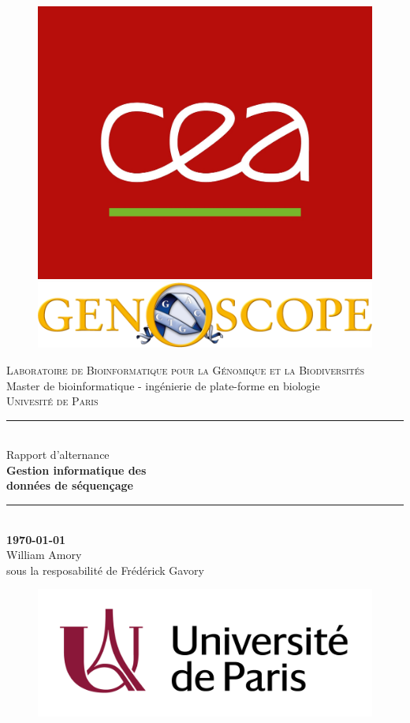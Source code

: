 \begin{titlepage}

    \newcommand{\HRule}{\rule{\linewidth}{0.5mm}} %
  
    \begin{figure}[ht!]
        \includegraphics[width=0.15\linewidth]{img/cea.jpg}
        \hspace{6cm}
        \includegraphics[width=0.5\linewidth]{img/genoscope_logo.png}
    \end{figure}
    \vspace{1cm}
  
    \begin{center}
  
        \textsc{\LARGE Laboratoire de Bioinformatique pour la Génomique et la Biodiversités}\\[1cm]
        \Large{ Master de bioinformatique - ingénierie de plate-forme en biologie \\ \textsc{Univesité de Paris}}\\[0.2cm]
  
  
        \vspace{1cm}
        \HRule \\[0.4cm]
        {\huge Rapport d'alternance}\\[0.2cm]
        {\Huge \bfseries Gestion informatique des \\ données de séquençage}\\
        \HRule \\[1cm]

        \LARGE{\textbf{\today}} \\[1cm]

        \LARGE{William Amory}\\
        \LARGE{sous la resposabilité de Frédérick Gavory}\\[1cm]
    
    \end{center}
  
    \begin{figure}[ht!]
        \includegraphics[width=0.4\linewidth]{img/logo}
    \end{figure}
    \newpage
  
\end{titlepage}